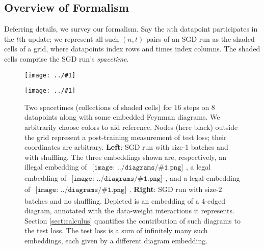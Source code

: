 \documentclass{article}
\newcommand{\plotmooh}[3]{
    \texttt{[image: ../\#1]}
}
\newcommand{\sdia}[1]{\begin{gathered}\texttt{[image: ../diagrams/\#1.png]}\end{gathered}}
\begin{document}
    \subsection{Overview of Formalism}


            Deferring details, we survey our formalism.  Say the $n$th
            datapoint participates in the $t$th update; we represent all such
            $(n, t)$ pairs of an SGD run as the shaded cells of a grid, where
            datapoints index rows and times index columns.  The shaded cells
            comprise the SGD run's \emph{spacetime}.
            \begin{figure}[H] 
                \centering  
                \plotmooh{diagrams/spacetime-e}{}{0.265\columnwidth}
                \plotmooh{diagrams/spacetime-f}{}{0.265\columnwidth}
                \caption{
                    Two spacetimes (collections of shaded cells) for $16$ steps
                    on $8$ datapoints along with some embedded Feynman
                    diagrams.  We arbitrarily choose colors to aid reference. 
                    Nodes (here black) outside the grid represent a
                    post-training measurement of test loss; their coordinates
                    are arbitrary.
                    {\bf Left}: SGD run with size-$1$ batches and with
                        shuffling.  The three embeddings shown are,
                        respectively, an illegal embedding of
                        $\sdia{(01-2)(01-12)}$, a legal embedding of
                        $\sdia{(01-2)(01-12)}$, and a legal embedding of
                        $\sdia{(0-1-2)(01-12)}$.
                    {\bf Right}: SGD run with size-$2$ batches and no
                        shuffling.  Depicted is an embedding of a $4$-edged
                        diagram, annotated with the data-weight interactions it
                        represents.  Section \ref{sect:calculus} quantifies the
                        contribution of such diagrams to the test loss.  The
                        test loss is a sum of infinitely many such embeddings,
                        each given by a different diagram embedding.  
                }
                \label{fig:spacetimes}
            \end{figure}
\end{document}
